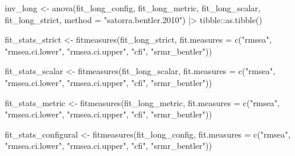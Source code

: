 \documentclass[
  letterpaper,
  DIV=11,
  numbers=noendperiod]{scrreprt}
\newenvironment{Shaded}{\begin{snugshade}}{\end{snugshade}}
\newcommand{\AttributeTok}[1]{\textcolor[rgb]{0.40,0.45,0.13}{#1}}
\newcommand{\FunctionTok}[1]{\textcolor[rgb]{0.28,0.35,0.67}{#1}}
\newcommand{\NormalTok}[1]{\textcolor[rgb]{0.00,0.23,0.31}{#1}}
\newcommand{\OtherTok}[1]{\textcolor[rgb]{0.00,0.23,0.31}{#1}}
\newcommand{\SpecialCharTok}[1]{\textcolor[rgb]{0.37,0.37,0.37}{#1}}
\newcommand{\StringTok}[1]{\textcolor[rgb]{0.13,0.47,0.30}{#1}}
\begin{document}
\begin{Shaded}
\begin{Highlighting}[]
\NormalTok{inv\_long }\OtherTok{\textless{}{-}} \FunctionTok{anova}\NormalTok{(fit\_long\_config, fit\_long\_metric, fit\_long\_scalar, fit\_long\_strict,}
                  \AttributeTok{method =} \StringTok{"satorra.bentler.2010"}\NormalTok{) }\SpecialCharTok{|\textgreater{}} 
\NormalTok{  tibble}\SpecialCharTok{::}\FunctionTok{as.tibble}\NormalTok{()}

\NormalTok{fit\_stats\_strict }\OtherTok{\textless{}{-}} \FunctionTok{fitmeasures}\NormalTok{(fit\_long\_strict, }
                                \AttributeTok{fit.measures =} \FunctionTok{c}\NormalTok{(}\StringTok{"rmsea"}\NormalTok{, }\StringTok{"rmsea.ci.lower"}\NormalTok{, }\StringTok{"rmsea.ci.upper"}\NormalTok{, }\StringTok{"cfi"}\NormalTok{, }\StringTok{"srmr\_bentler"}\NormalTok{))}

\NormalTok{fit\_stats\_scalar }\OtherTok{\textless{}{-}} \FunctionTok{fitmeasures}\NormalTok{(fit\_long\_scalar, }
                                \AttributeTok{fit.measures =} \FunctionTok{c}\NormalTok{(}\StringTok{"rmsea"}\NormalTok{, }\StringTok{"rmsea.ci.lower"}\NormalTok{, }\StringTok{"rmsea.ci.upper"}\NormalTok{, }\StringTok{"cfi"}\NormalTok{, }\StringTok{"srmr\_bentler"}\NormalTok{))}

\NormalTok{fit\_stats\_metric }\OtherTok{\textless{}{-}} \FunctionTok{fitmeasures}\NormalTok{(fit\_long\_metric, }
                                \AttributeTok{fit.measures =} \FunctionTok{c}\NormalTok{(}\StringTok{"rmsea"}\NormalTok{, }\StringTok{"rmsea.ci.lower"}\NormalTok{, }\StringTok{"rmsea.ci.upper"}\NormalTok{, }\StringTok{"cfi"}\NormalTok{, }\StringTok{"srmr\_bentler"}\NormalTok{))}

\NormalTok{fit\_stats\_configural }\OtherTok{\textless{}{-}} \FunctionTok{fitmeasures}\NormalTok{(fit\_long\_config, }
                                \AttributeTok{fit.measures =} \FunctionTok{c}\NormalTok{(}\StringTok{"rmsea"}\NormalTok{, }\StringTok{"rmsea.ci.lower"}\NormalTok{, }\StringTok{"rmsea.ci.upper"}\NormalTok{, }\StringTok{"cfi"}\NormalTok{, }\StringTok{"srmr\_bentler"}\NormalTok{))}


\end{Highlighting}
\end{Shaded}
\end{document}
